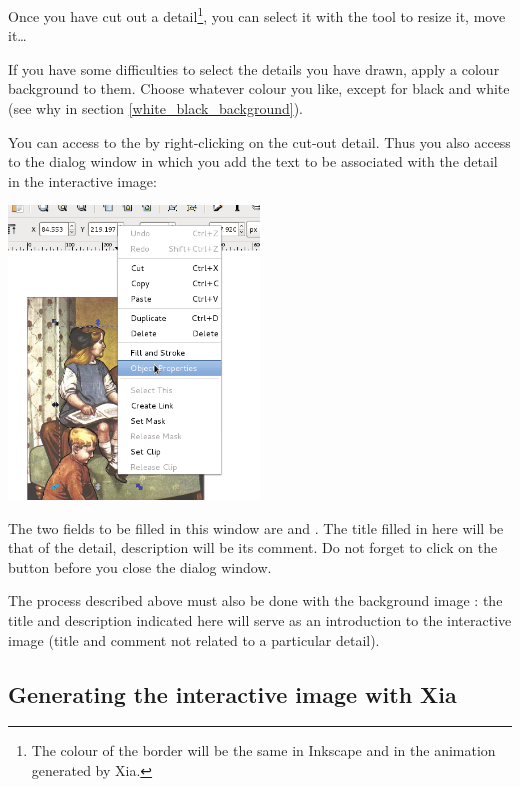 Once you have cut out a detail\footnote{The colour of the border will be the same in Inkscape and 
in the animation generated by Xia.}, you can select it with the tool  
 to resize it, move it\ldots

\begin{tip}
If you have some difficulties to select the details you have drawn,
apply a colour background to them. Choose whatever colour you like, except for black and white
(see why in section \ref{white_black_background}).
\end{tip}


You can access to the  by right-clicking on the cut-out detail.
Thus you also access to the dialog window in which you add the text to be associated with the 
detail in the interactive image:\\

\begin{center}
 \includegraphics[width=0.5\textwidth]{./images/object_properties}\\ 
\end{center}

The two fields to be filled in this window are  and 
.  The title filled in here will be that of the detail, 
description will be its comment. Do not forget to click on the 
button before you close the  dialog window.

The process described above must also be done with the background image : 
the title and description indicated here will serve as an introduction to 
the interactive image (title and comment not related to a particular detail).

\subsection{Generating the interactive image with Xia}

